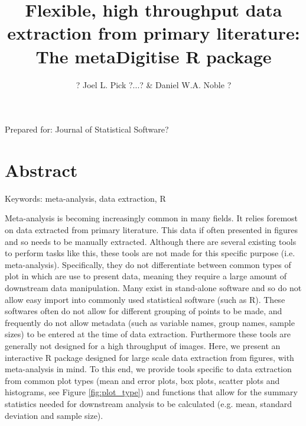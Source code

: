 \documentclass{article}
\title{Flexible, high throughput data extraction from primary literature: The metaDigitise R package}
\author{? Joel L. Pick ?...? \& Daniel W.A. Noble ?}
\begin{document}
\doublespacing
\raggedright



\maketitle
Prepared for: Journal of Statistical Software?

\section*{Abstract}

Keywords: meta-analysis, data extraction, R

\clearpage



Meta-analysis is becoming increasingly common in many fields. It relies foremost on data extracted from primary literature. This data if often presented in figures and so needs to be manually extracted. Although there are several existing tools to perform tasks like this, these tools are not made for this specific purpose (i.e. meta-analysis).
Specifically, they do not differentiate between common types of plot in which are use to present data, meaning they require a large amount of downstream data manipulation. Many exist in stand-alone software and so do not allow easy import into commonly used statistical software (such as R). These softwares often do not allow for different grouping of points to be made, and frequently do not allow metadata (such as variable names, group names, sample sizes) to be entered at the time of data extraction. Furthermore these tools are generally not designed for a high throughput of images. 
Here, we present an interactive R package designed for large scale data extraction from figures, with meta-analysis in mind. To this end, we provide tools specific to data extraction from common plot types (mean and error plots, box plots, scatter plots and histograms, see Figure \ref{fig:plot_type}) and functions that allow for the summary statistics needed for downstream analysis to be calculated (e.g. mean, standard deviation and sample size). %
\end{document}
